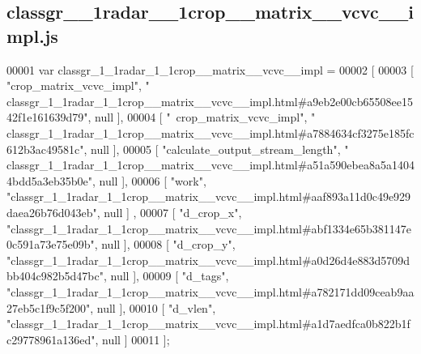 \subsection{classgr\+\_\+\_\+1radar\+\_\+\_\+1crop\+\_\+\+\_\+matrix\+\_\+\+\_\+vcvc\+\_\+\+\_\+impl.\+js}
\label{classgr__1__1radar__1__1crop____matrix____vcvc____impl_8js_source}

\begin{DoxyCode}
00001 var classgr_1_1radar_1_1crop__matrix__vcvc__impl =
00002 [
00003     [ \textcolor{stringliteral}{"crop\_matrix\_vcvc\_impl"}, \textcolor{stringliteral}{"
      classgr\_1\_1radar\_1\_1crop\_\_matrix\_\_vcvc\_\_impl.html#a9eb2e00cb65508ee1542f1e161639d79"}, null ],
00004     [ \textcolor{stringliteral}{"~crop\_matrix\_vcvc\_impl"}, \textcolor{stringliteral}{"
      classgr\_1\_1radar\_1\_1crop\_\_matrix\_\_vcvc\_\_impl.html#a7884634cf3275e185fc612b3ac49581c"}, null ],
00005     [ \textcolor{stringliteral}{"calculate\_output\_stream\_length"}, \textcolor{stringliteral}{"
      classgr\_1\_1radar\_1\_1crop\_\_matrix\_\_vcvc\_\_impl.html#a51a590ebea8a5a14044bdd5a3eb35b0e"}, null ],
00006     [ \textcolor{stringliteral}{"work"}, \textcolor{stringliteral}{"classgr\_1\_1radar\_1\_1crop\_\_matrix\_\_vcvc\_\_impl.html#aaf893a11d0c49e929daea26b76d043eb"}, null ]
      ,
00007     [ \textcolor{stringliteral}{"d\_crop\_x"}, \textcolor{stringliteral}{"classgr\_1\_1radar\_1\_1crop\_\_matrix\_\_vcvc\_\_impl.html#abf1334e65b381147e0c591a73e75e09b"}, 
      null ],
00008     [ \textcolor{stringliteral}{"d\_crop\_y"}, \textcolor{stringliteral}{"classgr\_1\_1radar\_1\_1crop\_\_matrix\_\_vcvc\_\_impl.html#a0d26d4e883d5709dbb404c982b5d47bc"}, 
      null ],
00009     [ \textcolor{stringliteral}{"d\_tags"}, \textcolor{stringliteral}{"classgr\_1\_1radar\_1\_1crop\_\_matrix\_\_vcvc\_\_impl.html#a782171dd09ceab9aa27eb5c1f9c5f200"}, null
       ],
00010     [ \textcolor{stringliteral}{"d\_vlen"}, \textcolor{stringliteral}{"classgr\_1\_1radar\_1\_1crop\_\_matrix\_\_vcvc\_\_impl.html#a1d7aedfca0b822b1fc29778961a136ed"}, null
       ]
00011 ];
\end{DoxyCode}

